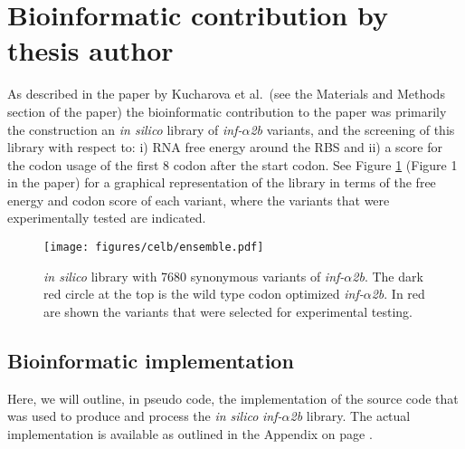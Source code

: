 \section{Bioinformatic contribution by thesis author}
As described in the paper by Kucharova et al.\ (see the Materials and Methods
section of the paper) the bioinformatic contribution to the paper was primarily
the construction an \textit{in silico} library of \textit{inf-$\alpha$2b}
variants, and the screening of this library with respect to: i) RNA free energy
around the RBS and ii) a score for the codon usage of the first 8 codon after
the start codon. See Figure \ref{fig:ensemble} (Figure 1 in the paper) for a
graphical representation of the library in terms of the free energy and codon
score of each variant, where the variants that were experimentally tested are
indicated.

\begin{figure}[b]
	\begin{center}
		\texttt{[image: figures/celb/ensemble.pdf]}
	\end{center}
	\caption{\textit{in silico} library with 7680 synonymous variants of
	\textit{inf-$\alpha$2b}. The dark red circle at the top is the wild type codon
	optimized \textit{inf-$\alpha$2b}. In red are shown the variants that were
	selected for experimental testing.}
	\label{fig:ensemble}
\end{figure}

\subsection{Bioinformatic implementation}
Here, we will outline, in pseudo code, the implementation of the source code
that was used to produce and process the \textit{in silico}
\textit{inf-$\alpha$2b} library. The actual implementation is available as
outlined in the Appendix on page \pageref{source_code}.

\inputminted[fontsize=\small]{python}{pseudo_code/pseudo_code.py}

